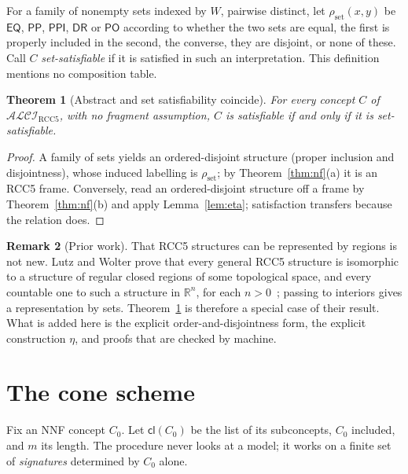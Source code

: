 \documentclass[11pt]{article}
\newcommand{\ALCIRCC}[1]{\mathcal{ALCI}_{\mathrm{RCC#1}}}
\newcommand{\DR}{\mathsf{DR}}
\newcommand{\PO}{\mathsf{PO}}
\newcommand{\PP}{\mathsf{PP}}
\newcommand{\PPI}{\mathsf{PPI}}
\newcommand{\EQ}{\mathsf{EQ}}
\newcommand{\cl}{\mathsf{cl}}
\newcommand{\reals}{\mathbb{R}}
\theoremstyle{plain}
\newtheorem{theorem}{Theorem}[section]
\theoremstyle{definition}
\newtheorem{remark}[theorem]{Remark}
\begin{document}
For a family of nonempty sets indexed by $W$, pairwise distinct, let
$\rho_{\mathrm{set}}(x,y)$ be $\EQ$, $\PP$, $\PPI$, $\DR$ or $\PO$ according to
whether the two sets are equal, the first is properly included in the second,
the converse, they are disjoint, or none of these. Call $C$
\emph{set-satisfiable} if it is satisfied in such an interpretation. This
definition mentions no composition table.

\begin{theorem}[Abstract and set satisfiability coincide]\label{thm:sets}
For every concept $C$ of $\ALCIRCC{5}$, with no fragment assumption, $C$ is
satisfiable if and only if it is set-satisfiable.
\end{theorem}

\begin{proof}
A family of sets yields an ordered-disjoint structure (proper inclusion and
disjointness), whose induced labelling is $\rho_{\mathrm{set}}$; by
Theorem~\ref{thm:nf}(a) it is an RCC5 frame. Conversely, read an ordered-disjoint
structure off a frame by Theorem~\ref{thm:nf}(b) and apply
Lemma~\ref{lem:eta}; satisfaction transfers because the relation does.
\end{proof}

\begin{remark}[Prior work]\label{rem:lw23}
That RCC5 structures can be represented by regions is not new. Lutz and Wolter
prove that every general RCC5 structure is isomorphic to a structure of regular
closed regions of some topological space, and every countable one to such a
structure in $\reals^n$, for each $n>0$~\cite[Thm.~23]{LutzWolter2006}; passing to
interiors gives a representation by sets. Theorem~\ref{thm:sets} is therefore a
special case of their result. What is added here is the explicit
order-and-disjointness form, the explicit construction $\eta$, and proofs that
are checked by machine.
\end{remark}

\section{The cone scheme}
\label{sec:scheme}

Fix an NNF concept $C_0$. Let $\cl(C_0)$ be the list of its subconcepts,
$C_0$ included, and $m$ its length. The procedure never looks at a model; it
works on a finite set of \emph{signatures} determined by $C_0$ alone.
\end{document}
